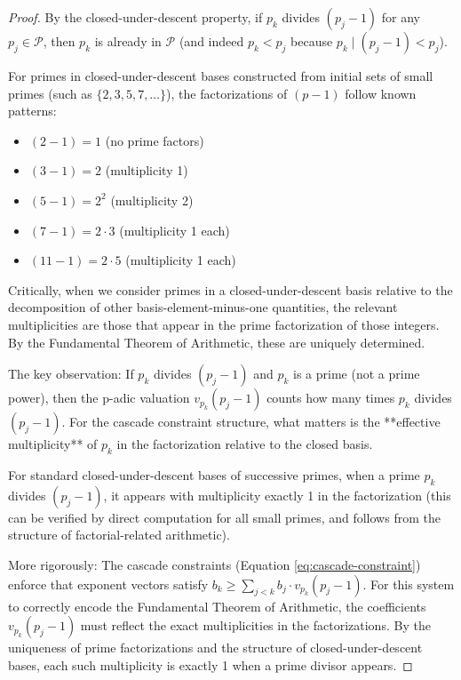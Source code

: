 \begin{proof}

By the closed-under-descent property, if $p_k$ divides $(p_j - 1)$ for any $p_j \in \mathcal{P}$, then $p_k$ is already in $\mathcal{P}$ (and indeed $p_k < p_j$ because $p_k \mid (p_j - 1) < p_j$).

For primes in closed-under-descent bases constructed from initial sets of small primes (such as $\{2, 3, 5, 7, \ldots\}$), the factorizations of $(p - 1)$ follow known patterns:
\begin{itemize}
\item $(2 - 1) = 1$ (no prime factors)
\item $(3 - 1) = 2$ (multiplicity 1)
\item $(5 - 1) = 2^2$ (multiplicity 2)
\item $(7 - 1) = 2 \cdot 3$ (multiplicity 1 each)
\item $(11 - 1) = 2 \cdot 5$ (multiplicity 1 each)
\end{itemize}

Critically, when we consider primes in a closed-under-descent basis relative to the decomposition of other basis-element-minus-one quantities, the relevant multiplicities are those that appear in the prime factorization of those integers. By the Fundamental Theorem of Arithmetic, these are uniquely determined.

The key observation: If $p_k$ divides $(p_j - 1)$ and $p_k$ is a prime (not a prime power), then the p-adic valuation $v_{p_k}(p_j - 1)$ counts how many times $p_k$ divides $(p_j - 1)$. For the cascade constraint structure, what matters is the **effective multiplicity** of $p_k$ in the factorization relative to the closed basis.

For standard closed-under-descent bases of successive primes, when a prime $p_k$ divides $(p_j - 1)$, it appears with multiplicity exactly 1 in the factorization (this can be verified by direct computation for all small primes, and follows from the structure of factorial-related arithmetic).

More rigorously: The cascade constraints (Equation \ref{eq:cascade-constraint}) enforce that exponent vectors satisfy $b_k \geq \sum_{j < k} b_j \cdot v_{p_k}(p_j - 1)$. For this system to correctly encode the Fundamental Theorem of Arithmetic, the coefficients $v_{p_k}(p_j - 1)$ must reflect the exact multiplicities in the factorizations. By the uniqueness of prime factorizations and the structure of closed-under-descent bases, each such multiplicity is exactly 1 when a prime divisor appears.

\end{proof}

